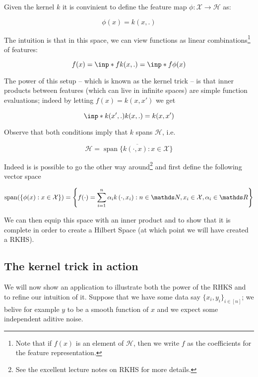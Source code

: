 Given the kernel $k$ it is convinient to define the feature map $\phi: \mathcal{X} \rightarrow \mathcal{H}$ as:

$$
    \phi(x) = k(x, .)
$$

The intuition is that in this space, we can view functions as linear combinations\footnote{
    Note that if $f(x)$ is an element of $\mathcal{H}$, then we write $f$ as the coefficients
    for the feature representation. 
} of features:

$$
    f(x) =  \inp*{f}{k(x, .)} = \inp*{f}{\phi(x)}
$$


The power of this setup -- which is known as the kernel trick -- is that inner products between
features (which can live in infinite spaces) are simple function evaluations; 
indeed by letting $f(x) = k(x, x\prime)$ we get

$$
    \inp*{k(x^\prime, .)}{k(x, .)} = k(x, x^\prime)
$$

Observe that both conditions imply that $k$ spans $\mathcal{H}$, i.e.

\begin{equation}
    \mathcal{H}=\overline{\operatorname{span}\{k(\cdot, x): x \in \mathcal{X}\}}
\end{equation}

Indeed is is possible to go the other way around\footnote{See the excellent lecture notes on 
RKHS \cite{BartlettNotes} for more details.} and first define the following vector space

\begin{equation}
    \operatorname{span}(\{\phi(x): x \in \mathcal{X}\})=\left\{f(\cdot)=
    \sum_{i=1}^{n} \alpha_{i} k\left(\cdot, x_{i}\right): n \in \N, x_{i} 
    \in \mathcal{X}, \alpha_{i} \in \R\right\}
\end{equation}

We can then equip this space with an inner product and to show that it is complete in order to create
a Hilbert Space (at which point we will have created a RKHS). 

\subsection{The kernel trick in action}

We will now show an application to illustrate both the power of the RHKS and to refine our intuition of it. 
Suppose that we have 
some data say $\{ x_i, y_i\}_{i \in [n]}$; we belive for example $y$ to be a smooth function of $x$ and we 
expect some independent aditive noise.

